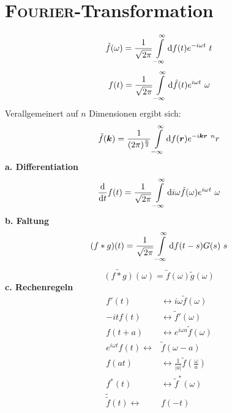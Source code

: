 \section{\textsc{Fourier}-Transformation}
\begin{equation*}
\tilde{f}(\omega)=\frac{1}{\sqrt{2\pi}}\int\limits_{{-\infty}}^{{\infty}}\mathrm{d}{f(t)e^{-i\omega t}}\ {t}
\end{equation*}
\begin{equation*}
f(t)=\frac{1}{\sqrt{2\pi}}\int\limits_{{-\infty}}^{{\infty}}\mathrm{d}{\tilde{f}(t)e^{i\omega t}}\ {\omega}
\end{equation*}
Verallgemeinert auf $n$ Dimensionen ergibt sich:\\
\begin{equation*}
\tilde{f}(\bm{k})=\frac{1}{({2\pi})^{\frac{n}{2}}}\int\limits_{{-\infty}}^{{\infty}}\mathrm{d}{f(\bm{r})e^{-i\bm{k}\bm{r}}}\ {^nr}
\end{equation*}
\linebreak
\textbf{a. Differentiation}\\
\begin{equation*}
\frac{\mathrm{d}{}}{\mathrm{d}{t}}f(t)=\frac{1}{\sqrt{2\pi}}\int\limits_{{-\infty}}^{{\infty}}\mathrm{d}{i\omega\tilde{f}(\omega)e^{i\omega t}}\ {\omega}
\end{equation*}
\linebreak
\textbf{b. Faltung}\\
\begin{equation*}
(f*g)(t)=\frac{1}{\sqrt{2\pi}}\int\limits_{{-\infty}}^{{\infty}}\mathrm{d}{f(t-s)G(s)}\ {s}
\end{equation*}
\begin{equation*}
\widetilde{(f*g)}(\omega)=\tilde{f}(\omega)\tilde{g}(\omega)
\end{equation*}
\textbf{c. Rechenregeln}\\
\begin{align*}
f'(t) & \leftrightarrow i\omega\tilde{f}(\omega)\\
-itf(t) & \leftrightarrow \tilde{f}'(\omega)\\
f(t+a) & \leftrightarrow  e^{i\omega a}\tilde{f}(\omega)\\
e^{i\omega t}f(t) \leftrightarrow & \tilde{f}(\omega-a)\\
f(at) & \leftrightarrow \frac{1}{|a|}\tilde{f}\left(\frac{\omega}{a}\right)\\
f^*(t) & \leftrightarrow \tilde{f}^*(\omega)\\
\tilde{\tilde{f}}(t) \leftrightarrow & f(-t)\\
\end{align*}

